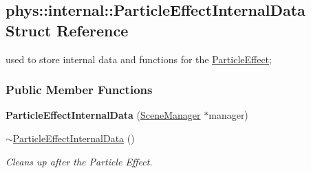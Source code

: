 \hypertarget{structphys_1_1internal_1_1ParticleEffectInternalData}{
\subsection{phys::internal::ParticleEffectInternalData Struct Reference}
\label{d6/d85/structphys_1_1internal_1_1ParticleEffectInternalData}
}


used to store internal data and functions for the \hyperlink{classphys_1_1ParticleEffect}{ParticleEffect};  


\subsubsection*{Public Member Functions}
\begin{DoxyCompactItemize}
\item 
\hypertarget{structphys_1_1internal_1_1ParticleEffectInternalData_a1f27a535244583b3f2fdd13ff811b5d5}{
{\bfseries ParticleEffectInternalData} (\hyperlink{classphys_1_1SceneManager}{SceneManager} $\ast$manager)}
\label{d6/d85/structphys_1_1internal_1_1ParticleEffectInternalData_a1f27a535244583b3f2fdd13ff811b5d5}

\item 
\hyperlink{structphys_1_1internal_1_1ParticleEffectInternalData_a42dbfeea2d498ef1b023cebe4e5d4257}{$\sim$ParticleEffectInternalData} ()
\begin{DoxyCompactList}\small\item\em Cleans up after the Particle Effect. \item\end{DoxyCompactList}\end{DoxyCompactItemize}
